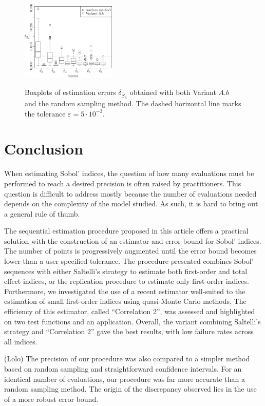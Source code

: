 {\begin{figure}[!ht]
\caption{Boxplots of estimation errors $\delta_{\overline{S}_u}$ obtained with both Variant $A.b$ and the random sampling method. The dashed horizontal line marks the tolerance $\varepsilon=5\cdot 10^{-3}$.}
\centering
\vspace*{0.2cm}
\includegraphics[width=0.4\textwidth]{comp_mc_tot.eps}
\label{compa_MC_tot}
\end{figure}}


\section{Conclusion}
When estimating Sobol' indices, the question of how many evaluations must be performed to reach a desired precision is often raised by practitioners. This question is difficult to address mostly because the number of evaluations needed depends on the complexity of the model studied. As such, it is hard to bring out a general rule of thumb. 

The sequential estimation procedure proposed in this article offers a practical solution with the construction of an estimator and error bound for Sobol' indices. The number of points is progressively augmented until the error bound becomes lower than a user specified tolerance. The procedure presented combines Sobol' sequences with either Saltelli's strategy to estimate both first-order and total effect indices, or the replication procedure to estimate only first-order indices. Furthermore, we investigated the use of a recent estimator well-suited to the estimation of small first-order indices using quasi-Monte Carlo methods. The efficiency of this estimator, called ``Correlation 2'', was assessed and highlighted on two test functions and an application. Overall, the variant combining Saltelli's strategy and ``Correlation 2'' gave the best results, with low failure rates across all indices.

{\color{purple}(Lolo) The precision of our procedure was also compared to a simpler method based on random sampling and straightforward confidence intervals. For an identical number of evaluations, our procedure was far more accurate than a random sampling method. The origin of the discrepancy observed lies in the use of a more robust error bound.}

